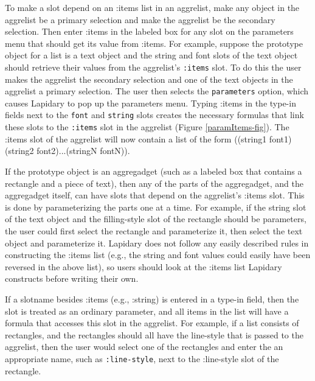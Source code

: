 \begin{itemize}
To make a slot depend on an :items list in an aggrelist, make any
object in the aggrelist be a primary selection and make the
aggrelist be the secondary selection. Then enter :items in
the labeled box for any slot on the parameters menu that should get
its value from :items.  For example, suppose the
prototype object for a list is a text object and
the string and font slots of the text object should retrieve their
values from the aggrelist's {\tt :items} slot. To do this the user
makes the aggrelist the secondary selection and one
of the text objects in the aggrelist a primary selection. The user
then selects the {\tt parameters} option, which
causes Lapidary to pop up the parameters menu. Typing :items in the
type-in fields next to the {\tt font} and {\tt string} slots creates
the necessary formulas that link these slots to the {\tt :items} slot in
the aggrelist (Figure \ref{paramItems-fig}). The :items slot of
the aggrelist will now contain a list of the form
((string1 font1) (string2 font2)...(stringN fontN)).

If the prototype object is an aggregadget (such as a labeled box that
contains a rectangle and a piece of text), then any of the parts of the
aggregadget, and the aggregadget itself, can have slots that depend on
the aggrelist's :items slot. This is done by parameterizing the parts
one at a time. For example, if the string slot of the text object and
the filling-style slot of the rectangle should be parameters, the user
could first select the rectangle and parameterize it, then select the
text object and parameterize it. Lapidary does not follow any easily
described rules in constructing the :items list (e.g., the string and
font values could easily have been reversed in the above list), so users
should look at the :items list Lapidary constructs before writing their own.

If a slotname besides
:items (e.g., :string) is entered in a type-in field, then the slot
is treated as an ordinary parameter, and all items in the list will
have a formula that accesses this slot in the aggrelist. For example,
if a list consists of rectangles, and the rectangles should all
have the line-style that is passed to the aggrelist, then
the user would select one of the rectangles and enter the an
appropriate name, such as {\tt :line-style}, next to the :line-style
slot of the rectangle.



\end{itemize}


